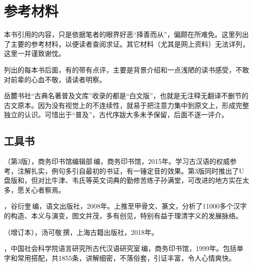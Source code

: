 \chapter*{参\quad 考\quad 材\quad 料}

本书引用的内容，只是依据笔者的眼界好恶“择善而从”，偏颇在所难免。这里列出了主要的参考材料，以便读者查阅求证。其它材料（尤其是网上资料）无法详列，这里一并谨致谢忱。

列出的每本书后面，有的带有点评，主要是背景介绍和一点浅陋的读书感受，不敢对前辈的心血不敬，请读者明察。

岳麓书社“古典名著普及文库”收录的都是“白文版”，也就是无注释无翻译不删节的古文原本。因为没有视觉上的不连续性，就易于把注意力集中到原文上，形成完整独立的认识。可惜出于“普及”，古代序跋大多未予保留，后面不逐一评介。


\lypdfbookmark\section*{工具书}

（第3版），商务印书馆编辑部\,编，商务印书馆，2015年。学习古汉语的权威参考，注解扎实，例句多引自最初的书证，有一锤定音的效果。第3版同时推出了U盘版和，但对比牛津、韦氏等英文词典的勤修苦练子孙满堂，可改进的地方实在太多，愿关心者察焉。

，谷衍奎\,编，语文出版社，2008年。上推至甲骨文、篆文，分析了11000多个汉字的构造、本义与演变，图文并茂，多有创见，特别有益于理清字义的发展脉络。

（增订本），汤可敬\,撰，上海古籍出版社，2018年。

，中国社会科学院语言研究所古代汉语研究室\,编，商务印书馆，1999年。包括单字和常用搭配，共1855条，讲解细密，不落俗套，引证丰富，令人心情爽快。

